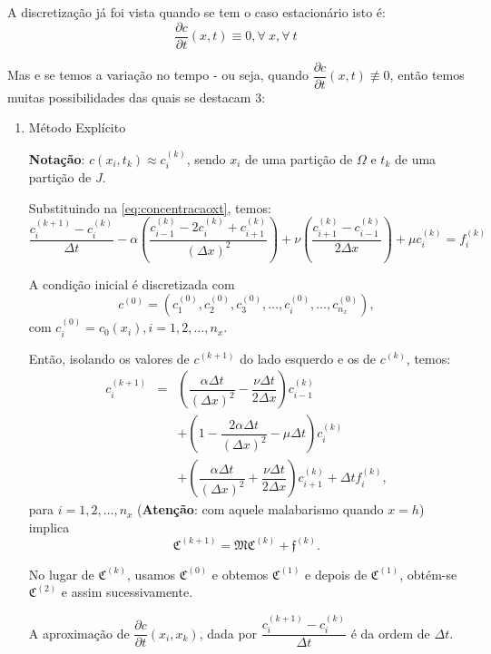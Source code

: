 A discretização já foi vista quando se tem o caso estacionário isto é:
$$\dfrac{\partial c}{\partial t}(x, t) \equiv 0, \forall~ x, \forall~ t$$

Mas e se temos a variação no tempo - ou seja, quando  $\dfrac{\partial c}{\partial t}(x, t) \not\equiv 0$, então temos muitas possibilidades das quais se destacam $3$:

\begin{enumerate}
\item Método Explícito

\textbf{Notação}: $c(x_{i}, t_{k}) \approx c_{i}^{(k)}$, sendo $x_{i}$ de uma partição de $\Omega$ e $t_{k}$ de uma partição de $J$.

Substituindo na \autoref{eq:concentracaoxt}, temos:
$$\dfrac{c_{i}^{(k+1)} - c_{i}^{(k)}}{\Delta t}  - \alpha \left(\dfrac{c_{i-1}^{(k)} - 2 c_{i}^{(k)} + c_{i+1}^{(k)}}{(\Delta x)^{2}}  \right) + \nu \left(\dfrac{c_{i+1}^{(k)} - c_{i-1}^{(k)}}{2 \Delta x}\right) + \mu c_{i}^{(k)} = f_{i}^{(k)}$$

A condição inicial é discretizada com
$$c^{(0)} = \left(c_{1}^{(0)}, c_{2}^{(0)}, c_{3}^{(0)}, \ldots, c_{i}^{(0)}, \ldots, c_{n_{x}}^{(0)} \right),$$
com $c_{i}^{(0)} = c_{0}(x_i), i = 1, 2, \ldots, n_{x}$.

Então, isolando os valores de $c^{(k+1)}$ do lado esquerdo e os de $c^{(k)}$, temos:
$$\begin{array}{rcl}
c_{i}^{(k+1)}
&=& \left(\dfrac{\alpha \Delta t}{(\Delta x)^{2}} - \dfrac{\nu \Delta t}{2\Delta x}\right) c_{i-1}^{(k)} \\
& & + \left(1- \dfrac{2\alpha \Delta t}{(\Delta x)^{2}} - \mu \Delta t\right) c_{i}^{(k)} \\
& & + \left(\dfrac{\alpha \Delta t}{(\Delta x)^{2}} + \dfrac{\nu \Delta t}{2\Delta x}\right) c_{i+1}^{(k)} + \Delta t f_i^{(k)},
\end{array}$$
para $i = 1, 2, \ldots, n_{x}$ (\textbf{Atenção}: com aquele malabarismo quando $x = h$) implica
$$\mathfrak{C}^{(k+1)} = \mathfrak{M} \mathfrak{C}^{(k)} + \mathfrak{f}^{(k)}.$$

No lugar de $\mathfrak{C}^{(k)}$, usamos $\mathfrak{C}^{(0)}$ e obtemos $\mathfrak{C}^{(1)}$ e depois de $\mathfrak{C}^{(1)}$, obtém-se $\mathfrak{C}^{(2)}$ e assim sucessivamente.

\begin{remark}
A aproximação de $\dfrac{\partial c}{\partial t} \left(x_{i}, x_{k}\right)$, dada por $\dfrac{c_{i}^{(k+1)} - c_{i}^{(k)}}{\Delta t}$ é da ordem de $\Delta t$.
\end{remark}


\end{enumerate}
